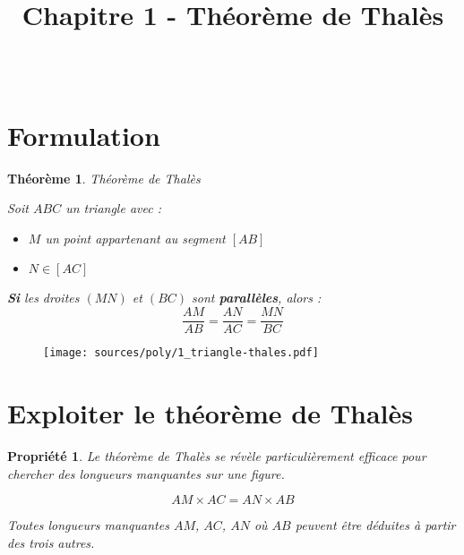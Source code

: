 \documentclass[paper=a4, fontsize=12pt]{scrartcl} %
\title{	
  \vspace{-10ex}
  \horrule{0.5pt} \\[0.4cm] %
  \huge Chapitre 1 - Théorème de Thalès \\ %
  \horrule{2pt} \\[0.5cm] %
}
\author{}
\date{\vspace{-10ex}} %
\begin{document}

\newtheorem{Definition}{Définition}
\newtheorem{Theorem}{Théorème}
\newtheorem{Proposition}{Propriété}

\renewcommand{\labelitemi}{$\bullet$}
\renewcommand{\labelitemii}{$\circ$}

\maketitle %
\setlength{\columnseprule}{1pt}

\section{Formulation}

\begin{multicols}{2}

\begin{Theorem}{Théorème de Thalès}

Soit $ABC$ un triangle avec : 
\begin{itemize}
\item $M$ un point appartenant au segment $[AB]$
\item $N \in [AC]$
\end{itemize}
\textbf{Si} les droites $(MN)$ et $(BC)$ sont \textbf{parallèles}, alors :
$$\dfrac{AM}{AB} = \dfrac{AN}{AC} = \dfrac{MN}{BC}$$

\end{Theorem}

\begin{figure}[H]
  \centering
  \texttt{[image: sources/poly/1\_triangle-thales.pdf]}
\end{figure}

\end{multicols}

\section{Exploiter le théorème de Thalès}

\begin{Proposition}{
Le théorème de Thalès se révèle particulièrement efficace pour chercher des longueurs manquantes sur une figure.}

$$AM \times AC = AN \times AB$$

Toutes longueurs manquantes $AM$, $AC$, $AN$ où $AB$ peuvent être déduites à partir des trois autres.
\end{Proposition}
\end{document}
